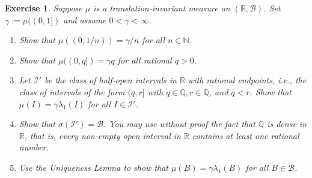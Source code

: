 \documentclass{article}
\newtheorem{exercise}[theorem]{Exercise}
\begin{document}
\begin{exercise} 
    Suppose $\mu$ is a translation-invariant measure on $(\mathbb{R}, \mathcal{B})$. Set $\gamma := \mu((0, 1])$ and assume $0 < \gamma < \infty$.
    \begin{enumerate}
        \item[(a)] Show that $\mu((0, 1/n)) = \gamma / n$ for all $n \in \mathbb{N}$.
        \item[(b)] Show that $\mu((0, q]) = \gamma q$ for all rational $q > 0$.
        \item[(c)] Let $\mathcal{I}'$ be the class of half-open intervals in $\mathbb{R}$ with rational endpoints, i.e., the class of intervals of the form $(q, r]$ with $q \in \mathbb{Q}, r \in \mathbb{Q}$, and $q < r$. Show that $\mu(I) = \gamma \lambda_1(I)$ for all $I \in \mathcal{I}'$.
        \item[(d)] Show that $\sigma(\mathcal{I}') = \mathcal{B}$. You may use without proof the fact that $\mathbb{Q}$ is dense in $\mathbb{R}$, that is, every non-empty open interval in $\mathbb{R}$ contains at least one rational number.
        \item[(e)] Use the Uniqueness Lemma to show that $\mu(B) = \gamma \lambda_1(B)$ for all $B \in \mathcal{B}$.
    \end{enumerate}
\end{exercise}
\end{document}
